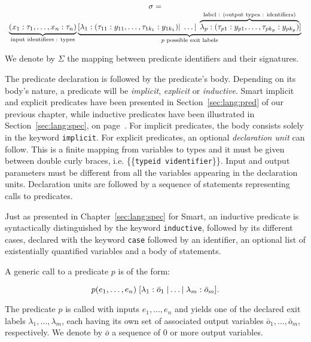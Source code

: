\documentclass[11pt]{article}
\def\slang{\textsf{Smart}}
\newcommand{\disp}[1]{\lstinline&#1&}
\newcommand{\predcall}
{p(e_1, \ldots, e_n) \; [\lambda_1: \bar{o}_1 \; \arrowvert \ldots \arrowvert \; \lambda_m: \bar{o}_m]}
\newcommand{\ver}{\arrowvert \;}
\begin{document}
\[
\begin{array}{c}
\sigma = \\
\underbrace{(x_1 : \tau_1, \ldots, x_n : \tau_n)}_{\textrm{input identifiers : types}}
         \underbrace{[\lambda_1: (\tau_{11} : y_{11}, \ldots ,\tau_{1k_1} : y_{1k_1}) \ver \ldots \ver 
         \overbrace{\lambda_p : (\tau_{p1} : y_{p1}, \ldots, \tau_{pk_p} : y_{pk_p})}^{\textrm{label : (output types : identifiers)}}]}_{\textrm{$p$ possible exit labels}}
\end{array}
\]

We denote by $\Sigma$ the mapping between predicate identifiers and their 
signatures.

The predicate declaration is followed by the predicate's body. Depending on its 
body's nature, a predicate will be \emph{implicit}, \emph{explicit} or 
\emph{inductive}. {\slang} implicit and explicit predicates have been presented 
in Section~\ref{sec:lang:pred} of our previous chapter, while inductive predicates 
have been illustrated in Section~\ref{sec:lang:spec}, on page~\pageref{ch3:inductive:pred}. 
For implicit predicates, the 
body consists solely in the keyword \disp{implicit}. For explicit predicates, an 
optional \emph{declaration unit} can follow. This is a finite mapping from 
variables to types and it must be given between double curly braces, i.e. 
\{\{\disp{typeid videntifier}\}\}. Input and output parameters must be different 
from all the variables appearing in the declaration units. Declaration units are 
followed by a sequence of statements representing calls to predicates. 

Just as presented in Chapter~\ref{sec:lang:spec} for {\slang}, an inductive 
predicate is syntactically distinguished by the 
keyword \disp{inductive}, followed by its different cases, declared with the keyword 
\disp{case} followed by an identifier, an optional list of existentially 
quantified variables and a body of statements. 

A generic call to a predicate $p$ is of the form:

\[
\predcall.
\]\label{ch4:predcall:def}

The predicate $p$ is called with inputs $e_1, \ldots, e_n$ and yields one of the
declared exit labels $\lambda_1, \ldots, \lambda_m$, each having its own set of 
associated output variables $\bar{o}_1, \ldots, \bar{o}_m$, respectively. We 
denote by
$\bar{o}$ a sequence of 0 or more output variables.
\end{document}
